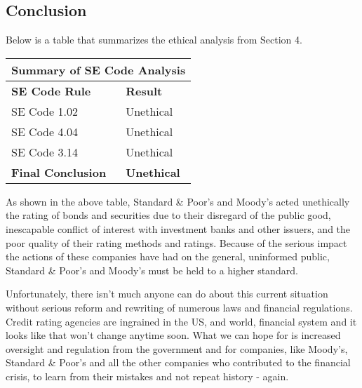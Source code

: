 \documentclass[11pt]{article}
\begin{document}
\begin{multicols}{2}
\section{Conclusion}

Below is a table that summarizes the ethical analysis from Section 4.
\newline

\begin{tabular}{|l|l|}
\hline
\multicolumn{2}{|c|}{Summary of SE Code Analysis} \\
\hline
\textbf{SE Code Rule} & \textbf{Result} \\ 
\hline
SE Code 1.02 & Unethical \\ 
\hline
SE Code 4.04 & Unethical \\
\hline
SE Code 3.14 & Unethical \\
\hline
\textbf{Final Conclusion} & \textbf{Unethical} \\
\hline
\end{tabular}
\newline

As shown in the above table, Standard \& Poor's and Moody's acted unethically the rating of bonds and securities due to their disregard of the public good, inescapable conflict of interest with investment banks and other issuers, and the poor quality of their rating methods and ratings.  Because of the serious impact the actions of these companies have had on the general, uninformed public, Standard \& Poor's and Moody's must be held to a higher standard.  

Unfortunately, there isn't much anyone can do about this current situation without serious reform and rewriting of numerous laws and financial regulations.  Credit rating agencies are ingrained in the US, and world, financial system and it looks like that won't change anytime soon.  What we can hope for is increased oversight and regulation from the government and for companies, like Moody's, Standard \& Poor's and all the other companies who contributed to the financial crisis, to learn from their mistakes and not repeat history - again.

\end{multicols}
\newpage


\nocite{*}




\end{document}
